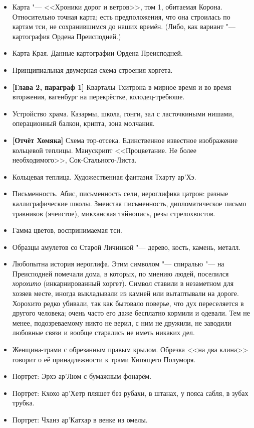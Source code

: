 \begin{itemize}
\item Карта "--- <<Хроники дорог и ветров>>, том 1, обитаемая Корона.
Относительно точная карта;
есть предположения, что она строилась по картам тси, не сохранившимся до наших времён.
(Либо, как вариант "--- картография Ордена Преисподней.)
\item Карта Края.
Данные картографии Ордена Преисподней.
\item Принципиальная двумерная схема строения хоргета.
\item \textbf{[Глава 2, параграф 1]}
Кварталы Тхитрона в мирное время и во время вторжения, вагенбург на перекрёстке, колодец-требюше.
\item Устройство храма.
Казармы, школа, гонги, зал с ласточкиными нишами, операционный балкон, крипта, зона молчания.
\item \textbf{[Отчёт Хомяка]}
Схема тор-отсека.
Единственное известное изображение кольцевой теплицы.
Манускрипт <<Процветание. Не более необходимого>>, Сок-Стального-Листа.
\item Кольцевая теплица.
Художественная фантазия Тхарту ар'Хэ.
\item Письменность.
Абис, письменность сели, иероглифика цатрон: разные каллиграфические школы.
Змеистая письменность, дипломатическое письмо травников (ячеистое), микханская тайнопись, резы стрелохвостов.
\item Гамма цветов, воспринимаемая тси.
\item Образцы амулетов со Старой Личинкой "--- дерево, кость, камень, металл.
\item Любопытна история иероглифа.
Этим символом "--- спиралью "--- на Преисподней помечали дома, в которых, по мнению людей, поселился \emph{хорохито} (инкарнированный хоргет).
Символ ставили в незаметном для хозяев месте, иногда выкладывали из камней или вытаптывали на дороге.
Хорохито редко убивали, так как бытовало поверье, что дух переселяется в другого человека;
очень часто его даже бесплатно кормили и одевали.
Тем не менее, подозреваемому никто не верил, с ним не дружили, не заводили любовные связи и вообще старались не иметь никаких дел.
\item Женщина-трами с обрезанным правым крылом.
Обрезка <<на два клина>> говорит о её принадлежности к трами Кипящего Полуморя.
\item Портрет: Эрхэ ар'Люм с бумажным фонарём.
\item Портрет: Кхохо ар'Хетр пляшет без рубахи, в штанах, у пояса сабля, в зубах трубка.
\item Портрет: Чханэ ар'Катхар в венке из омелы.

\end{itemize}
